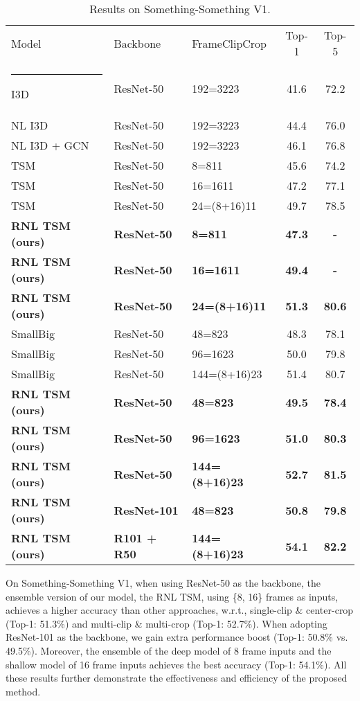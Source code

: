 \documentclass[a4paper,conference]{IEEEtran}
\makeatletter
\newcommand{\thickhline}{\noalign {\ifnum 0=`}\fi \hrule height 1pt
    \futurelet \reserved@a \@xhline
}
\makeatother
\begin{document}
\begin{table}
\caption{Results on Something-Something V1. }
\label{table:sota_some}
\centering
\setlength{\tabcolsep}{3.9pt}
\begin{tabular}{lllcc}
Model & Backbone & FrameClipCrop & Top-1 & Top-5 \\
\thickhline
 I3D \cite{wang2018videos} & ResNet-50 & 192=3223& 41.6& 72.2\\
 NL I3D \cite{wang2018videos} & ResNet-50 & 192=3223 & 44.4 & 76.0\\
NL I3D + GCN \cite{wang2018videos} & ResNet-50 & 192=3223 & 46.1 & 76.8\\
TSM \cite{lin2019tsm} & ResNet-50 & 8=811 & 45.6 & 74.2\\
TSM \cite{lin2019tsm} & ResNet-50 & 16=1611 & 47.2 & 77.1\\
TSM \cite{lin2019tsm} & ResNet-50 & 24=(8+16)11 & 49.7 & 78.5\\
\textbf{RNL TSM (ours)} & \textbf{ResNet-50} & \textbf{8=811} & \textbf{47.3} & \textbf{-} \\
\textbf{RNL TSM (ours)} & \textbf{ResNet-50} & \textbf{16=1611} & \textbf{49.4} & \textbf{-} \\
\textbf{RNL TSM (ours)} & \textbf{ResNet-50} & \textbf{24=(8+16)11} & \textbf{51.3} & \textbf{80.6} \\
\hline
SmallBig \cite{li2020smallbignet} & ResNet-50 & 48=823 & 48.3 & 78.1 \\
SmallBig \cite{li2020smallbignet}& ResNet-50 & 96=1623 & 50.0 & 79.8 \\
SmallBig \cite{li2020smallbignet} & ResNet-50 & 144=(8+16)23 & 51.4 & 80.7 \\
\textbf{RNL TSM (ours)} & \textbf{ResNet-50} & \textbf{48=823} & \textbf{49.5} & \textbf{78.4} \\
\textbf{RNL TSM (ours)} & \textbf{ResNet-50} & \textbf{96=1623} & \textbf{51.0} & \textbf{80.3} \\
\textbf{RNL TSM (ours)} & \textbf{ResNet-50} & \textbf{144=(8+16)23} & \textbf{52.7} & \textbf{81.5} \\
\hdashline
\textbf{RNL TSM (ours)} & \textbf{ResNet-101} & \textbf{48=823} & \textbf{50.8} & \textbf{79.8} \\
\textbf{RNL TSM (ours)} & \textbf{R101 + R50} & \textbf{144=(8+16)23} & \textbf{54.1} & \textbf{82.2} \\
\end{tabular}
\end{table}


On Something-Something V1, when using ResNet-50 as the backbone, the ensemble version of our model, the RNL TSM, using \{8, 16\} frames as inputs, achieves a higher accuracy than other approaches, w.r.t., single-clip \& center-crop (Top-1: 51.3\%) and multi-clip \& multi-crop (Top-1: 52.7\%). When adopting ResNet-101 as the backbone, we gain extra performance boost (Top-1: 50.8\% vs. 49.5\%). Moreover, the ensemble of the deep model of 8 frame inputs and the shallow model of 16 frame inputs achieves the best accuracy (Top-1: 54.1\%). All these results further demonstrate the effectiveness and efficiency of the proposed method. 
\end{document}
